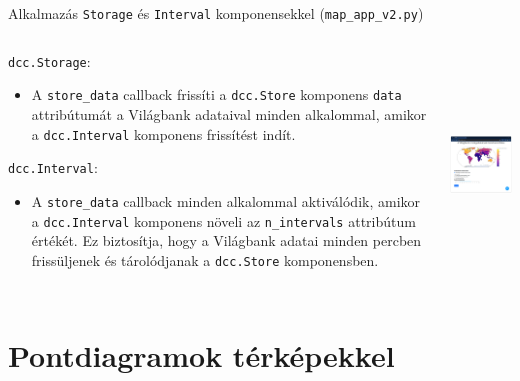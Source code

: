 \documentclass[english, aspectratio=169]{beamer}
\makeatletter
\let\origtableofcontents=\tableofcontents
\def\tableofcontents{\@ifnextchar[{\origtableofcontents}{\gobbletableofcontents}}
\def\gobbletableofcontents#1{\origtableofcontents}
\makeatother
\begin{document}
	\begin{frame}{Alkalmazás \texttt{Storage} és \texttt{Interval} komponensekkel (\texttt{map\_app\_v2.py})}
		\begin{columns}
			\begin{column}{.6\textwidth}
				\texttt{dcc.Storage}:
				\begin{itemize}
					\item A \texttt{store\_data} callback frissíti a \texttt{dcc.Store} komponens \texttt{data} attribútumát a Világbank adataival minden alkalommal, amikor a \texttt{dcc.Interval} komponens frissítést indít.
				\end{itemize}
				\texttt{dcc.Interval}:
				\begin{itemize}
					\item A \texttt{store\_data} callback minden alkalommal aktiválódik, amikor a \texttt{dcc.Interval} komponens növeli az \texttt{n\_intervals} attribútum értékét. Ez biztosítja, hogy a Világbank adatai minden percben frissüljenek és tárolódjanak a \texttt{dcc.Store} komponensben.
				\end{itemize}
			\end{column}
			\begin{column}{.4\textwidth}
				\begin{center}
					\includegraphics[width=6cm, height=6cm, keepaspectratio]{images/scatter_24.png}
				\end{center}
			\end{column}
		\end{columns}
	\end{frame}
	
	\section{Pontdiagramok térképekkel}
	
	\begin{frame}{}
		\tableofcontents[currentsection]
	\end{frame}
	
\end{document}
